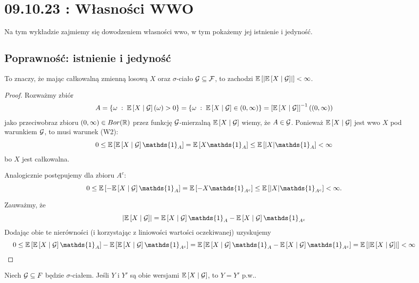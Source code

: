 \section{09.10.23 : Własności WWO}

Na tym wykładzie zajmiemy się dowodzeniem własności wwo, w tym pokażemy jej istnienie i jedyność.

\subsection{Poprawność: istnienie i jedyność}

\begin{lemma}
  To znaczy, że mając całkowalną zmienną losową $X$ oraz $\sigma$-ciało $\mathcal{G}\subseteq\mathcal{F}$, to zachodzi $\expected{\left|\expected{X}{\set{G}}\right|}<\infty$.
\end{lemma}

\begin{proof}
  Rozważmy zbiór
  $$A=\{\omega\;:\;\expected{X}{\set{G}}(\omega)>0\}=\{\omega\;:\;\expected{X}{\set{G}}\in(0, \infty)\}=\left[\expected{X}{\set{G}}\right]^{-1}((0,\infty))$$
  jako przeciwobraz zbioru $(0,\infty)\in Bor(\operatorname{\mathbb{R}})$ przez funkcję $\mathcal{G}$-mierzalną $\expected{X}{\set{G}}$ wiemy, że $A\in \mathcal{G}$. Ponieważ $\expected{X}{\set{G}}$ jest wwo $X$ pod warunkiem $\mathcal{G}$, to musi warunek (W2): $$0\leq\expected{\expected{X}{\set{G}}\mathds{1}_A}=\expected{X\mathds{1}_A}\leq\expected{|X|\mathds{1}_A}<\infty$$
  bo $X$ jest całkowalna.

  Analogicznie postępujemy dla zbioru $A^c$:
  $$0\leq\expected{-\expected{X}{\set{G}}\mathds{1}_A}=\expected{-X\mathds{1}_{A^c}}\leq\expected{|X|\mathds{1}_{A^c}}<\infty.$$
  
  Zauważmy, że 
  $$\left|
    \expected{X}{\set{G}}
    \right| = \expected{X}{\set{G}}\mathds{1}_A-\expected{X}{\set{G}}\mathds{1}_{A^c}$$
  Dodając obie te nierówności (i korzystając z liniowości wartości oczekiwanej) uzyskujemy
  $$0\leq \expected{\expected{X}{\set{G}}\mathds{1}_A}-\expected{\expected{X}{\set{G}}\mathds{1}_{A^c}}=\expected{\expected{X}{\set{G}}\mathds{1}_A-\expected{X}{\set{G}}\mathds{1}_{A^c}}=\expected{\left|\expected{X}{\set{G}}\right|}<\infty$$
\end{proof}

\begin{lemma}[jedyność p.w.]
  Niech $\mathcal{G}\subseteq{F}$ będzie $\sigma$-ciałem. Jeśli $Y$ i $Y'$ są obie wersjami $\expected{X}{\set{G}}$, to $Y=Y'$ p.w..
\end{lemma}

